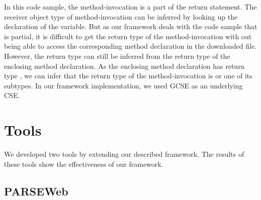 In this code sample, the method-invocation
 is a part of the return statement. The
receiver object type of method-invocation
 can be inferred by looking up the
declaration of the  variable. But as our framework
deals with the code sample that is partial, it is difficult to get
the return type of the method-invocation with out being able to
access the corresponding method declaration in the downloaded file.
However, the return type can still be inferred from the return type
of the enclosing method declaration. As the enclosing method
declaration has return type , we can infer that
the return type of the method-invocation 
is  or one of its subtypes. In our framework
implementation, we used GCSE as an underlying CSE.
\section{Tools}
\label{sec:extensions}

We developed two tools by extending our described framework. The results of these tools
show the effectiveness of our framework.
\subsection{PARSEWeb}
\label{sec:parseweb}

